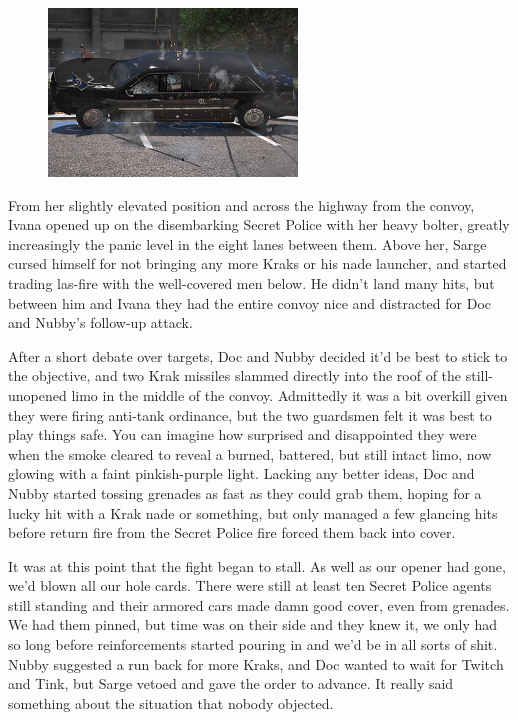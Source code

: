 \begin{figure}
	\begin{center}
		\includegraphics[width=\figwidth]{pics/19/41.png}
	\end{center}
\end{figure}
From her slightly elevated position and across the highway from the convoy, Ivana opened up on the disembarking Secret Police with her heavy bolter, greatly increasingly the panic level in the eight lanes between them. 
Above her, Sarge cursed himself for not bringing any more Kraks or his nade launcher, and started trading las-fire with the well-covered men below. 
He didn't land many hits, but between him and Ivana they had the entire convoy nice and distracted for Doc and Nubby's follow-up attack.

After a short debate over targets, Doc and Nubby decided it'd be best to stick to the objective, and two Krak missiles slammed directly into the roof of the still-unopened limo in the middle of the convoy. 
Admittedly it was a bit overkill given they were firing anti-tank ordinance, but the two guardsmen felt it was best to play things safe. 
You can imagine how surprised and disappointed they were when the smoke cleared to reveal a burned, battered, but still intact limo, now glowing with a faint pinkish-purple light. 
Lacking any better ideas, Doc and Nubby started tossing grenades as fast as they could grab them, hoping for a lucky hit with a Krak nade or something, but only managed a few glancing hits before return fire from the Secret Police fire forced them back into cover.

It was at this point that the fight began to stall. 
As well as our opener had gone, we'd blown all our hole cards. 
There were still at least ten Secret Police agents still standing and their armored cars made damn good cover, even from grenades. 
We had them pinned, but time was on their side and they knew it, we only had so long before reinforcements started pouring in and we'd be in all sorts of shit. 
Nubby suggested a run back for more Kraks, and Doc wanted to wait for Twitch and Tink, but Sarge vetoed and gave the order to advance. 
It really said something about the situation that nobody objected.

